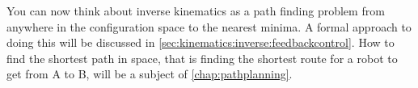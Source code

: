 You can now think about inverse kinematics as a path finding problem from anywhere in the configuration space to the nearest minima. A formal approach to doing this will be discussed in \cref{sec:kinematics:inverse:feedbackcontrol}. How to find the shortest path in space, that is finding the shortest route for a robot to get from A to B, will be a subject of \cref{chap:pathplanning}.


